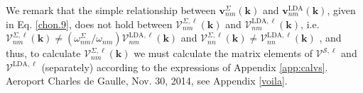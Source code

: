 We remark that the simple relationship between 
$\mathbf{v}^{\Sigma}_{nm}(\mathbf{k})$ 
and 
$\mathbf{v}^{\mathrm{LDA}}_{nm}(\mathbf{k})$,
given in 
Eq. \eqref{chon.9}, 
does not hold between
$\boldsymbol{\mathcal{V}}^{\Sigma,\ell}_{nm}(\mathbf{k})$   
and 
$\boldsymbol{\mathcal{V}}^{\mathrm{LDA},\ell}_{nm}(\mathbf{k})$,
i.e.
$\boldsymbol{\mathcal{V}}^{\Sigma,\ell}_{nm}(\mathbf{k})\ne
(\omega^\Sigma_{nm}/\omega_{nm})
\boldsymbol{\mathcal{V}}^{\mathrm{LDA},\ell}_{nm}(\mathbf{k})$ 
and
$\boldsymbol{\mathcal{V}}^{\Sigma,\ell}_{nn}(\mathbf{k})\ne
\boldsymbol{\mathcal{V}}^{\mathrm{LDA},\ell}_{nn}(\mathbf{k})$
,
and thus, to calculate
$\boldsymbol{\mathcal{V}}^{\Sigma,\ell}_{nm}(\mathbf{k})$ 
we must calculate the matrix elements of $\boldsymbol{\mathcal{V}}^{\mathcal{S},\ell}$ and
$\boldsymbol{\mathcal{V}}^{\mathrm{LDA},\ell}$ (separately)
according to the expressions of
Appendix \ref{app:calvs}. {\color{red}Aeroport Charles de Gaulle, Nov. 30,
2014, see Appendix \ref{voila}}.

